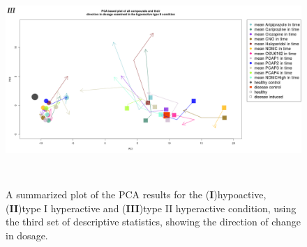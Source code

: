 \documentclass[a4paper,12pt]{article}
\begin{document}
\begin{figure}[h!]
\begin{center}
\includegraphics[width=16cm,height=8cm]{All_together_doses_DarkPTZset3.png}
\caption{A summarized plot of the PCA results for the (\textbf{I})hypoactive, (\textbf{II})type I hyperactive and (\textbf{III})type II hyperactive condition, using the third set of descriptive statistics, showing the direction of change in dosage.}
\end{center}
\end{figure}
\end{document}
